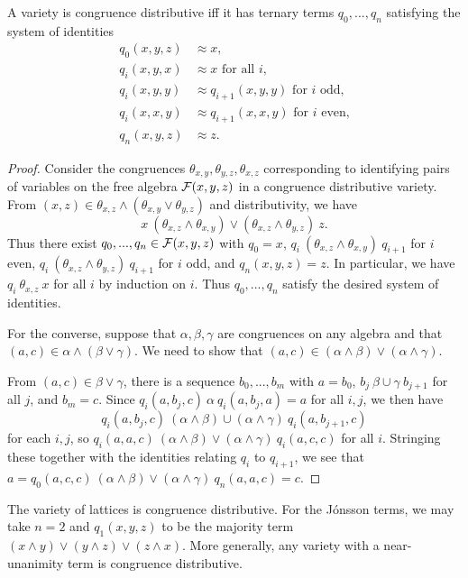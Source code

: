 \begin{appendices}
\begin{thm}\label{jonsson-terms} A variety is congruence distributive iff it has ternary terms $q_0, ..., q_n$ satisfying the system of identities
\begin{align*}
q_0(x,y,z) &\approx x,\\
q_i(x,y,x) &\approx x\text{ for all }i,\\
q_i(x,y,y) &\approx q_{i+1}(x,y,y)\text{ for }i\text{ odd,}\\
q_i(x,x,y) &\approx q_{i+1}(x,x,y)\text{ for }i\text{ even,}\\
q_n(x,y,z) &\approx z.
\end{align*}
\end{thm}
\begin{proof} Consider the congruences $\theta_{x,y}, \theta_{y,z}, \theta_{x,z}$ corresponding to identifying pairs of variables on the free algebra $\mathcal{F}(x,y,z)$ in a congruence distributive variety. From $(x,z) \in \theta_{x,z}\wedge (\theta_{x,y} \vee \theta_{y,z})$ and distributivity, we have
\[
x\ (\theta_{x,z} \wedge \theta_{x,y}) \vee (\theta_{x,z} \wedge \theta_{y,z})\ z.
\]
Thus there exist $q_0, ..., q_n \in \mathcal{F}(x,y,z)$ with $q_0 = x$, $q_i\ (\theta_{x,z} \wedge \theta_{x,y})\ q_{i+1}$ for $i$ even, $q_i\ (\theta_{x,z} \wedge \theta_{y,z})\ q_{i+1}$ for $i$ odd, and $q_n(x,y,z) = z$. In particular, we have $q_i\ \theta_{x,z}\ x$ for all $i$ by induction on $i$. Thus $q_0, ..., q_n$ satisfy the desired system of identities.

For the converse, suppose that $\alpha,\beta,\gamma$ are congruences on any algebra and that $(a,c) \in \alpha \wedge (\beta \vee \gamma)$. We need to show that $(a,c) \in (\alpha \wedge \beta) \vee (\alpha \wedge \gamma)$.

From $(a,c) \in \beta\vee\gamma$, there is a sequence $b_0, ..., b_m$ with $a = b_0$, $b_j\ \beta\cup\gamma\ b_{j+1}$ for all $j$, and $b_m = c$. Since $q_i(a,b_j,c)\ \alpha\ q_i(a,b_j,a) = a$ for all $i,j$, we then have
\[
q_i(a,b_j,c)\ (\alpha \wedge \beta) \cup (\alpha \wedge \gamma)\ q_i(a,b_{j+1},c)
\]
for each $i,j$, so $q_i(a,a,c)\ (\alpha \wedge \beta) \vee (\alpha \wedge \gamma)\ q_i(a,c,c)$ for all $i$. Stringing these together with the identities relating $q_i$ to $q_{i+1}$, we see that $a = q_0(a,c,c)\ (\alpha \wedge \beta) \vee (\alpha \wedge \gamma)\ q_n(a,a,c) = c$.
\end{proof}

\begin{ex} The variety of lattices is congruence distributive. For the J\'onsson terms, we may take $n = 2$ and $q_1(x,y,z)$ to be the majority term $(x\wedge y)\vee (y\wedge z) \vee (z \wedge x)$. More generally, any variety with a near-unanimity term is congruence distributive.
\end{ex}


\end{appendices}
